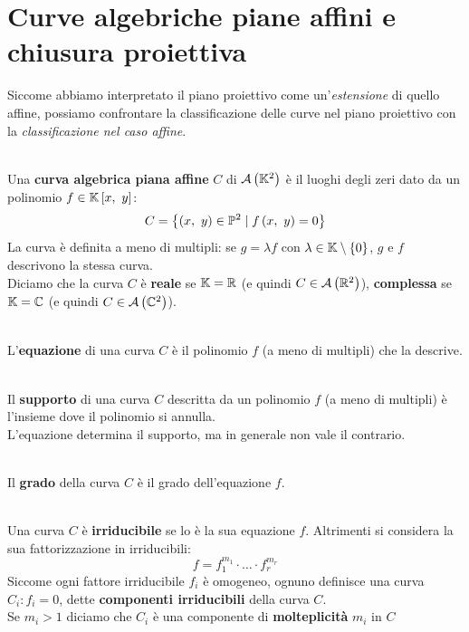 \section{Curve algebriche piane affini e chiusura proiettiva}
Siccome abbiamo interpretato il piano proiettivo come un'\textit{estensione} di quello affine, possiamo confrontare la classificazione delle curve nel piano proiettivo con la \textit{classificazione nel caso affine}.
\begin{define}~{}\\
	Una \textbf{curva algebrica piana affine} $C$ di ${\mathcal{A}\left(\mathbb{K}^2\right)}$ è il luoghi degli zeri dato da un polinomio $f\in\kamp\left[x,\ y\right]$:
\begin{equation}
	C=\left\{\left(x,\ y\right)\in\proj[2]{\ }\mid f\left(x,\ y\right)=0\right\}
\end{equation}
La curva è definita a meno di multipli: se $g=\lambda f$ con $\lambda\in\mathbb{K}\setminus\left\{0\right\}$, $g$ e $f$ descrivono la stessa curva.\\
Diciamo che la curva $C$ è \textbf{reale} se $\mathbb{K}=\mathbb{R}$ (e quindi $C\in{\ensuremath{\mathcal{A}\left(\mathbb{R}^2\right)}}$), \textbf{complessa} se $\mathbb{K}=\mathbb{C}$ (e quindi $C\in{\ensuremath{\mathcal{A}\left(\mathbb{C}^2\right)}}$).
\end{define}
\begin{define}~{}\\
L'\textbf{equazione} di una curva $C$ è il polinomio $f$ (a meno di multipli) che la descrive.
\end{define}
\begin{define}~{}\\
Il \textbf{supporto} di una curva $C$ descritta da un polinomio $f$ (a meno di multipli) è l'insieme dove il polinomio si annulla.\\
L'equazione determina il supporto, ma in generale non vale il contrario.
\end{define}
\begin{define}~{}\\
Il \textbf{grado} della curva $C$ è il grado dell'equazione $f$.
\end{define}
\begin{define}~{}\\
	Una curva $C$ è \textbf{irriducibile} se lo è la sua equazione $f$. Altrimenti si considera la sua fattorizzazione in irriducibili:
	\begin{equation}
		f=f_1^{m_1}\cdot \ldots \cdot f_r^{m_r}
	\end{equation}
	Siccome ogni fattore irriducibile $f_i$ è omogeneo, ognuno definisce una curva $C_i\colon f_i=0$, dette \textbf{componenti irriducibili} della curva $C$.\\
	Se $m_i>1$ diciamo che $C_i$ è una componente di \textbf{molteplicità} $m_i$ in $C$
\end{define}
